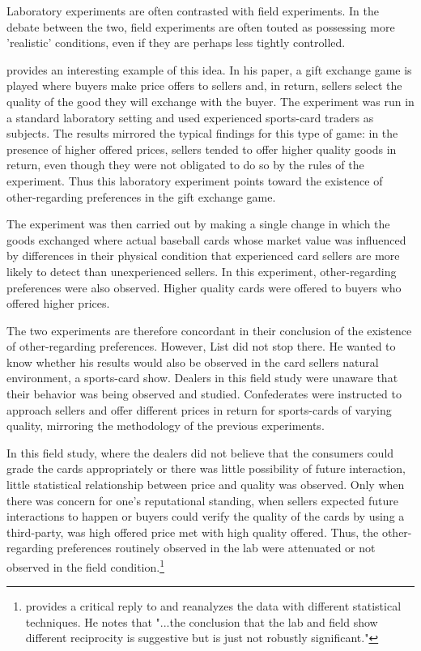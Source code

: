 \documentclass[12pt]{article}
\begin{document}
Laboratory experiments are often contrasted with field experiments. In the debate between the two, field experiments are often touted as possessing more 'realistic' conditions,  even if they are perhaps less tightly controlled. 

\cite{List2006} provides an interesting example of this idea. In his paper, a gift exchange game is played where buyers make price offers to sellers and, in return, sellers select the quality of the good they will exchange with the buyer. The experiment was run in a standard laboratory setting and used experienced sports-card traders as subjects. The results mirrored the typical findings for this type of game: in the presence of higher offered prices, sellers tended to offer higher quality goods in return, even though they were not obligated to do so by the rules of the experiment. Thus this laboratory experiment points toward the existence of other-regarding preferences in the gift exchange game. 

The experiment was then carried out by making a single change in which the goods exchanged where actual baseball cards whose market value was influenced by differences in their physical condition that experienced card sellers are more likely to detect than unexperienced sellers. In this experiment, other-regarding preferences were also observed. Higher quality cards were offered to buyers who offered higher prices.

The two experiments are therefore concordant in their conclusion of the existence of other-regarding preferences. However, List did not stop there. He wanted to know whether his results would also be observed in the card sellers natural environment, a sports-card show. Dealers in this field study were unaware that their behavior was being observed and studied. Confederates were instructed to approach sellers and offer different prices in return for sports-cards of varying quality, mirroring the methodology of the previous experiments. 

In this field study, where the dealers did not believe that the consumers could grade the cards appropriately or there was little possibility of future interaction, little statistical relationship between price and quality was observed. Only when there was concern for one's reputational standing, when sellers expected future interactions to happen or buyers could verify the quality of the cards by using a third-party, was high offered price met with high quality offered. Thus, the other-regarding preferences routinely observed in the lab were attenuated or not observed in the field condition.\footnote{\cite{camerer2011promise} provides a critical reply to \cite{List2006} and reanalyzes the data with different statistical techniques. He notes that "...the conclusion that the lab and field show different reciprocity is suggestive but is just not robustly significant."}
\end{document}
